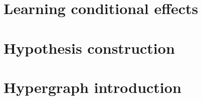 \documentclass[Master.tex]{subfiles}
\begin{document}


\section{Learning conditional effects}
    

\section{Hypothesis construction}
    

\section{Hypergraph introduction}
    

% 	
%
%     
%
% 	
%
% 	
\end{document}
